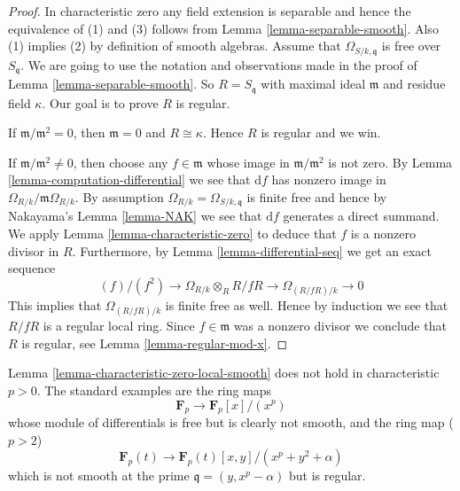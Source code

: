 \begin{proof}
In characteristic zero any field extension is separable and hence the
equivalence of (1) and (3) follows from Lemma \ref{lemma-separable-smooth}.
Also (1) implies (2) by definition of smooth algebras.
Assume that $\Omega_{S/k, \mathfrak q}$ is free over $S_{\mathfrak q}$.
We are going to use the notation and observations made in the
proof of Lemma \ref{lemma-separable-smooth}. So $R = S_{\mathfrak q}$
with maximal ideal $\mathfrak m$ and residue field $\kappa$.
Our goal is to prove $R$ is regular.

\medskip\noindent
If $\mathfrak m/\mathfrak m^2 = 0$, then $\mathfrak m = 0$
and $R \cong \kappa$. Hence $R$ is regular and we win.

\medskip\noindent
If $\mathfrak m/ \mathfrak m^2 \not = 0$, then choose any
$f \in \mathfrak m$ whose image in $\mathfrak m/ \mathfrak m^2$
is not zero. By Lemma \ref{lemma-computation-differential}
we see that $\text{d}f$ has nonzero image in
$\Omega_{R/k}/\mathfrak m\Omega_{R/k}$. By assumption
$\Omega_{R/k} = \Omega_{S/k, \mathfrak q}$ is finite free and
hence by Nakayama's Lemma \ref{lemma-NAK} we see that
$\text{d}f$ generates a direct summand. We apply
Lemma \ref{lemma-characteristic-zero}
to deduce that $f$ is a nonzero divisor in $R$.
Furthermore, by Lemma \ref{lemma-differential-seq} we get an exact sequence
$$
(f)/(f^2) \to \Omega_{R/k} \otimes_R R/fR \to \Omega_{(R/fR)/k} \to 0
$$
This implies that $\Omega_{(R/fR)/k}$ is finite free as well.
Hence by induction we see that $R/fR$ is a regular local ring.
Since $f \in \mathfrak m$ was a nonzero divisor we
conclude that $R$ is regular, see Lemma \ref{lemma-regular-mod-x}.
\end{proof}

\begin{example}
\label{example-characteristic-p}
Lemma \ref{lemma-characteristic-zero-local-smooth}
does not hold in characteristic $p > 0$.
The standard examples are the ring maps
$$
\mathbf{F}_p \longrightarrow \mathbf{F}_p[x]/(x^p)
$$
whose module of differentials is free but is clearly not smooth, and
the ring map ($p > 2$)
$$
\mathbf{F}_p(t) \to \mathbf{F}_p(t)[x, y]/(x^p + y^2 + \alpha)
$$
which is not smooth at the prime $\mathfrak q = (y, x^p - \alpha)$
but is regular.
\end{example}













